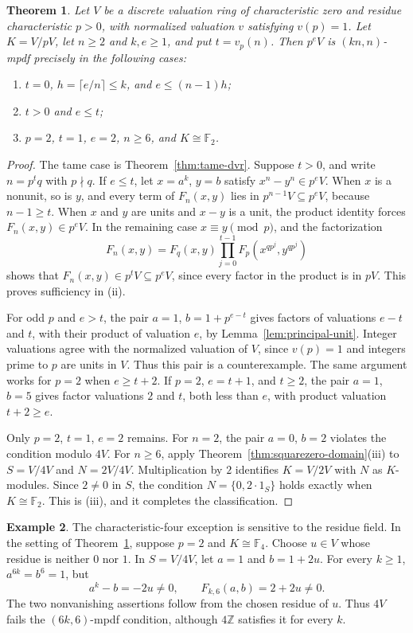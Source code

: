 \documentclass[11pt,a4paper]{amsart}
\newtheorem{theorem}{Theorem}[section]
\theoremstyle{definition}
\newtheorem{example}[theorem]{Example}
\theoremstyle{remark}
\numberwithin{equation}{section}
\begin{document}
\begin{theorem}\label{thm:unramified-dvr}
Let $V$ be a discrete valuation ring of characteristic zero and residue
characteristic $p>0$, with normalized valuation $v$ satisfying $v(p)=1$.
Let $K=V/pV$, let $n\ge2$ and $k,e\ge1$, and put $t=v_p(n)$.
Then $p^eV$ is $(kn,n)$-mpdf precisely in the following cases:
\begin{enumerate}
\item $t=0$, $h=\lceil e/n\rceil\le k$, and $e\le(n-1)h$;
\item $t>0$ and $e\le t$;
\item $p=2$, $t=1$, $e=2$, $n\ge6$, and $K\cong\mathbb F_2$.
\end{enumerate}
\end{theorem}
\begin{proof}
The tame case is Theorem~\ref{thm:tame-dvr}. Suppose $t>0$, and write
$n=p^tq$ with $p\nmid q$. If $e\le t$, let $x=a^k$, $y=b$ satisfy
$x^n-y^n\in p^eV$. When $x$ is a nonunit, so is $y$, and every term
of $F_n(x,y)$ lies in $p^{n-1}V\subseteq p^eV$, because $n-1\ge t$.
When $x$ and $y$ are units and $x-y$ is a unit, the product identity
forces $F_n(x,y)\in p^eV$. In the remaining case $x\equiv y\pmod p$,
and the factorization
\[
 F_n(x,y)=F_q(x,y)\prod_{j=0}^{t-1}
 F_p(x^{qp^j},y^{qp^j})
\]
shows that $F_n(x,y)\in p^tV\subseteq p^eV$, since every factor in
the product is in $pV$. This proves sufficiency in (ii).

For odd $p$ and $e>t$, the pair $a=1$, $b=1+p^{e-t}$ gives factors
of valuations $e-t$ and $t$, with their product of valuation $e$,
by Lemma~\ref{lem:principal-unit}. Integer valuations agree with the
normalized valuation of $V$, since $v(p)=1$ and integers prime to $p$
are units in $V$. Thus this pair is a counterexample. The same argument
works for $p=2$ when $e\ge t+2$. If $p=2$, $e=t+1$, and $t\ge2$,
the pair $a=1$, $b=5$ gives factor valuations $2$ and $t$, both less
than $e$, with product valuation $t+2\ge e$.

Only $p=2$, $t=1$, $e=2$ remains. For $n=2$, the pair $a=0$, $b=2$
violates the condition modulo $4V$. For $n\ge6$, apply
Theorem~\ref{thm:squarezero-domain}(iii) to $S=V/4V$ and
$N=2V/4V$. Multiplication by $2$ identifies $K=V/2V$ with $N$ as
$K$-modules. Since $2\ne0$ in $S$, the condition
$N=\{0,2\cdot1_S\}$ holds exactly when $K\cong\mathbb F_2$.
This is (iii), and it completes the classification.
\end{proof}

\begin{example}\label{ex:unramified-residue-obstruction}
The characteristic-four exception is sensitive to the residue field.
In the setting of Theorem~\ref{thm:unramified-dvr}, suppose $p=2$ and
$K\cong\mathbb F_4$. Choose $u\in V$ whose residue is neither $0$ nor
$1$. In $S=V/4V$, let $a=1$ and $b=1+2u$. For every $k\ge1$,
$a^{6k}=b^6=1$, but
\[
 a^k-b=-2u\ne0,\qquad F_{k,6}(a,b)=2+2u\ne0.
\]
The two nonvanishing assertions follow from the chosen residue of $u$.
Thus $4V$ fails the $(6k,6)$-mpdf condition, although $4\mathbb Z$
satisfies it for every $k$.
\end{example}
\end{document}
